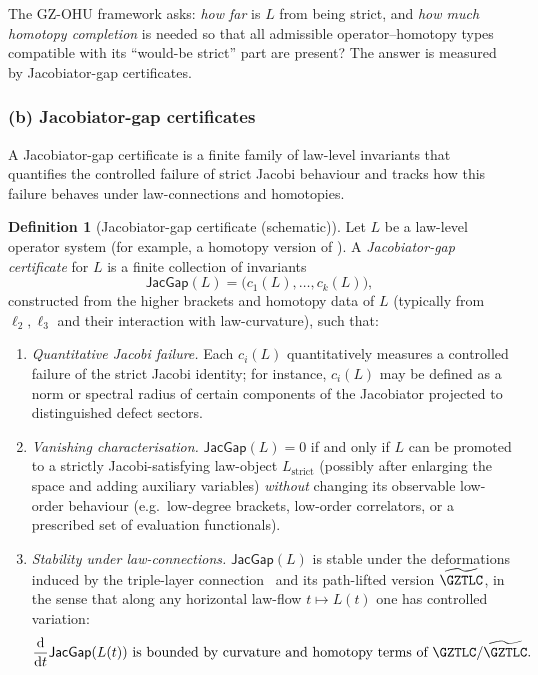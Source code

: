 \documentclass[11pt]{book}
\theoremstyle{plain}
\theoremstyle{definition}
\newtheorem{definition}[theorem]{Definition} \theoremstyle{remark}
\begin{document}
The GZ-OHU framework asks: \emph{how far} is $L$ from being strict, and
\emph{how much homotopy completion} is needed so that all admissible
operator--homotopy types compatible with its “would-be strict” part are
present? The answer is measured by Jacobiator-gap certificates.

\subsubsection*{(b) Jacobiator-gap certificates}

A Jacobiator-gap certificate is a finite family of law-level invariants
that quantifies the controlled failure of strict Jacobi behaviour and
tracks how this failure behaves under law-connections and homotopies.

\begin{definition}[Jacobiator-gap certificate (schematic)]
  Let $L$ be a law-level operator system (for example, a homotopy
  version of \GAlgebra). A \emph{Jacobiator-gap certificate} for $L$
  is a finite collection of invariants
  \[
    \mathsf{JacGap}(L) = \bigl(c_1(L),\dots,c_k(L)\bigr),
  \]
  constructed from the higher brackets and homotopy data of $L$
  (typically from $\ell_2,\ell_3$ and their interaction with
  law-curvature), such that:
  \begin{enumerate}[label=\roman*)]
    \item \emph{Quantitative Jacobi failure.}
          Each $c_i(L)$ quantitatively measures a controlled failure
          of the strict Jacobi identity; for instance, $c_i(L)$ may be
          defined as a norm or spectral radius of certain components
          of the Jacobiator projected to distinguished defect sectors.
    \item \emph{Vanishing characterisation.}
          $\mathsf{JacGap}(L)=0$ if and only if $L$ can be promoted to
          a strictly Jacobi-satisfying law-object
          $L_{\mathrm{strict}}$ (possibly after enlarging the space and
          adding auxiliary variables) \emph{without} changing its
          observable low-order behaviour (e.g.\ low-degree brackets,
          low-order correlators, or a prescribed set of evaluation
          functionals).
    \item \emph{Stability under law-connections.}
          $\mathsf{JacGap}(L)$ is stable under the deformations
          induced by the triple-layer connection \GZTLC\ and its
          path-lifted version $\widetilde{\GZTLC}$, in the sense that
          along any horizontal law-flow
          $t\mapsto L(t)$ one has controlled variation:
          \[
            \frac{\mathrm{d}}{\mathrm{d}t}\mathsf{JacGap}(L(t))
            \ \text{is bounded by curvature and homotopy terms of }
            \GZTLC/\widetilde{\GZTLC}.
          \]
  \end{enumerate}
\end{definition}
\end{document}
